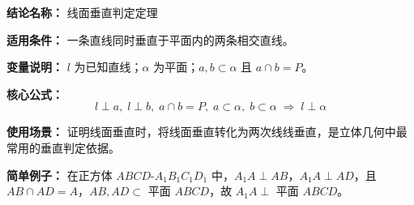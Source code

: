 \textbf{结论名称：} 线面垂直判定定理

\textbf{适用条件：} 一条直线同时垂直于平面内的两条相交直线。

\textbf{变量说明：} $l$ 为已知直线；$\alpha$ 为平面；$a,b\subset\alpha$ 且 $a\cap b=P$。

\textbf{核心公式：}
\[
\boxed{ l\perp a,\; l\perp b,\; a\cap b=P,\; a\subset\alpha,\; b\subset\alpha \;\Longrightarrow\; l\perp\alpha }
\]

\textbf{使用场景：} 证明线面垂直时，将线面垂直转化为两次线线垂直，是立体几何中最常用的垂直判定依据。

\textbf{简单例子：} 在正方体 $ABCD$-$A_1B_1C_1D_1$ 中，$A_1A\perp AB$，$A_1A\perp AD$，且 $AB\cap AD=A$，$AB,AD\subset$ 平面 $ABCD$，故 $A_1A\perp$ 平面 $ABCD$。